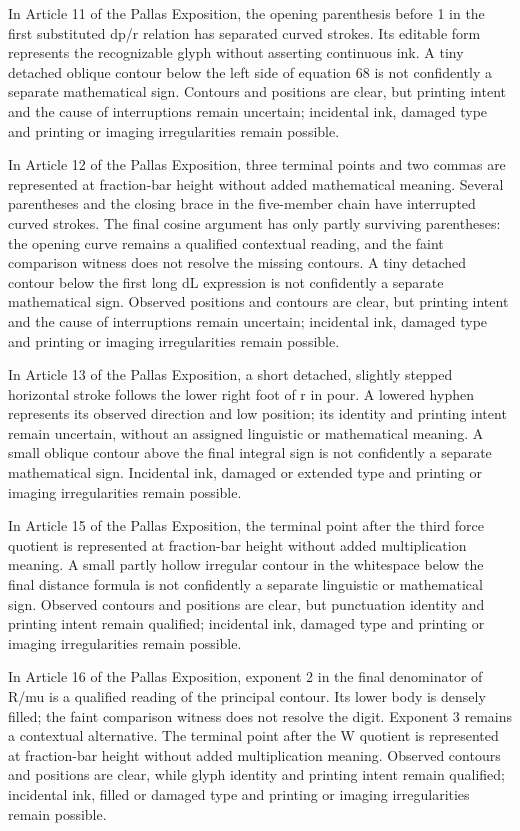 In Article 11 of the Pallas Exposition, the opening parenthesis before 1 in the first substituted dp/r relation has separated curved strokes. Its editable form represents the recognizable glyph without asserting continuous ink. A tiny detached oblique contour below the left side of equation 68 is not confidently a separate mathematical sign. Contours and positions are clear, but printing intent and the cause of interruptions remain uncertain; incidental ink, damaged type and printing or imaging irregularities remain possible.

In Article 12 of the Pallas Exposition, three terminal points and two commas are represented at fraction-bar height without added mathematical meaning. Several parentheses and the closing brace in the five-member chain have interrupted curved strokes. The final cosine argument has only partly surviving parentheses: the opening curve remains a qualified contextual reading, and the faint comparison witness does not resolve the missing contours. A tiny detached contour below the first long dL expression is not confidently a separate mathematical sign. Observed positions and contours are clear, but printing intent and the cause of interruptions remain uncertain; incidental ink, damaged type and printing or imaging irregularities remain possible.

In Article 13 of the Pallas Exposition, a short detached, slightly stepped horizontal stroke follows the lower right foot of r in pour. A lowered hyphen represents its observed direction and low position; its identity and printing intent remain uncertain, without an assigned linguistic or mathematical meaning. A small oblique contour above the final integral sign is not confidently a separate mathematical sign. Incidental ink, damaged or extended type and printing or imaging irregularities remain possible.

In Article 15 of the Pallas Exposition, the terminal point after the third force quotient is represented at fraction-bar height without added multiplication meaning. A small partly hollow irregular contour in the whitespace below the final distance formula is not confidently a separate linguistic or mathematical sign. Observed contours and positions are clear, but punctuation identity and printing intent remain qualified; incidental ink, damaged type and printing or imaging irregularities remain possible.

In Article 16 of the Pallas Exposition, exponent 2 in the final denominator of R/mu is a qualified reading of the principal contour. Its lower body is densely filled; the faint comparison witness does not resolve the digit. Exponent 3 remains a contextual alternative. The terminal point after the W quotient is represented at fraction-bar height without added multiplication meaning. Observed contours and positions are clear, while glyph identity and printing intent remain qualified; incidental ink, filled or damaged type and printing or imaging irregularities remain possible.

